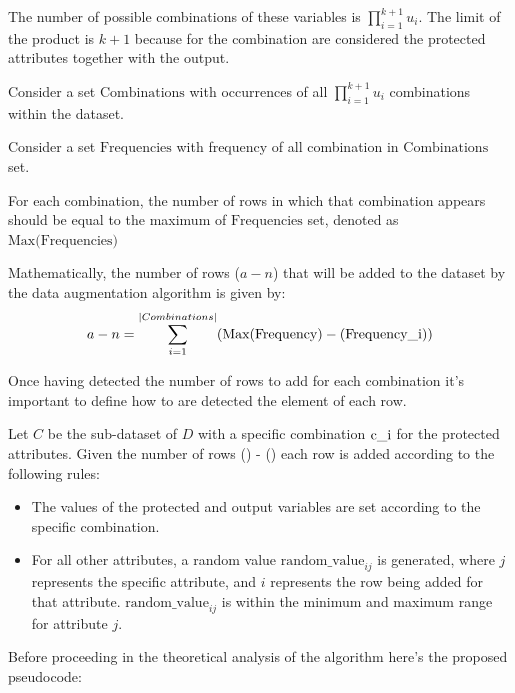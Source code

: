The number of possible combinations of these variables is $\prod_{i=1}^{k+1} u_i$. The limit of the product is ${k + 1}$ because for the combination are considered the protected attributes together with the output.

Consider a set $\text{Combinations}$ with occurrences of all $\prod_{i=1}^{k+1} u_i$ combinations within the dataset. 

Consider a set $\text{Frequencies}$ with frequency of all combination in $\text{Combinations}$ set.

For each combination, the number of rows in which that combination appears should be equal to the maximum of $\text{Frequencies}$ set, denoted as $\text{Max(Frequencies)}$

Mathematically, the number of rows ($a - n$) that will be added to the dataset by the data augmentation algorithm is given by:
\[
a - n = \sum_{i=1}^{|Combinations|}(\text{Max}(\text{Frequency}) - (\text{Frequency\textunderscore i}))
\]

Once having detected the number of rows to add for each combination it's important to define how to are detected the element of each row.

Let $C$ be the sub-dataset of $D$ with a specific combination $\text{c\textunderscore i}$ for the protected attributes. Given the number of rows () - () each row is added according to the following rules:

\begin{itemize}
    
    \item The values of the protected and output variables are set according to the specific combination.
   
    \item For all other attributes, a random value $\text{random\_value}_{ij}$ is generated, where $j$ represents the specific attribute, and $i$ represents the row being added for that attribute. $\text{random\_value}_{ij}$ is within the minimum and maximum range for attribute $j$.

\end{itemize}

Before proceeding in the theoretical analysis of the algorithm here's the proposed pseudocode:

